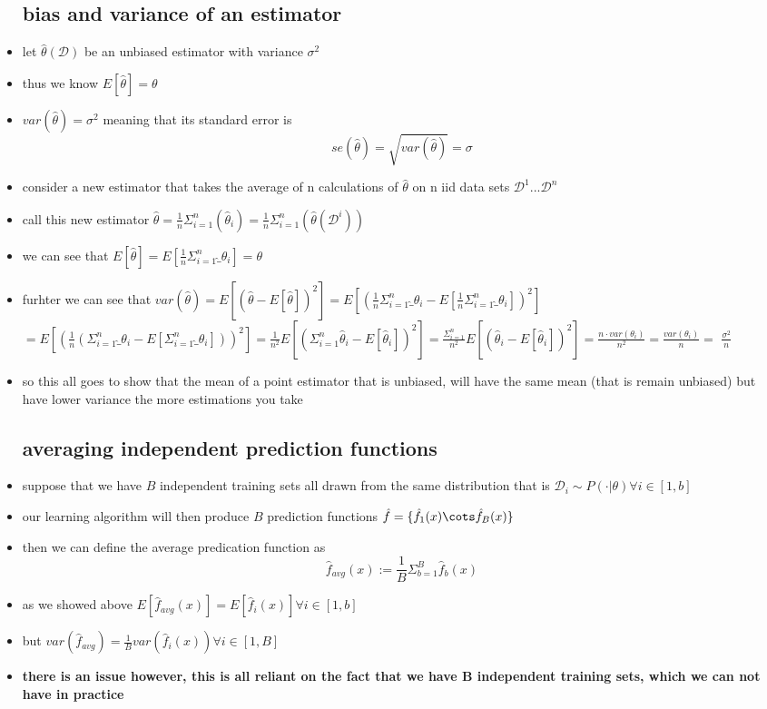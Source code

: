 \documentclass{article}
\begin{document}
\begin{itemize}
\subsection*{bias and variance of an estimator}
\item let $\hat{\theta}(\mathcal{D})$ be an unbiased estimator with variance $\sigma^2$ 
\item thus we know $E[\hat{\theta}]=\theta$
\item $var(\hat{\theta})=\sigma^2$ meaning that its standard error is $$se(\hat{\theta})=\sqrt{var(\hat{\theta})}=\sigma$$
\item consider  a new estimator that takes the average of n calculations of $\hat{\theta}$ on n iid data sets $\mathcal{D}^1...\mathcal{D}^n$
\item call this new estimator $\hat{\theta}=\frac{1}{n}\Sigma_{i=1}^{n}(\hat{\theta}_{i})=\frac{1}{n}\Sigma_{i=1}^{n}(\hat{\theta}(\mathcal{D}^i))$
\item we can see that $E[\hat{\theta}]=E[\frac{1}{n}\Sigma_{i=1}^{n}\hat_{\theta_i}]=\theta$
\item furhter we can see that $var(\hat{\theta})=E[(\hat{\theta}-E[\hat{\theta}])^2]=E[(\frac{1}{n}\Sigma_{i=1}^{n}\hat_{\theta_i}-E[\frac{1}{n}\Sigma_{i=1}^{n}\hat_{\theta_i}])^2]$ $=E[(\frac{1}{n}(\Sigma_{i=1}^{n}\hat_{\theta_i}-E[\Sigma_{i=1}^{n}\hat_{\theta_i}]))^2]=\frac{1}{n^2}E[(\Sigma_{i=1}^{n}  \hat{\theta}_i -E[\hat{\theta}_i] )^2 ]=\frac{\Sigma_{i=1}^{n}}{n^2}E[(
\hat{\theta}_i -E[\hat{\theta}_i] )^2 ]=\frac{n\cdot var(\theta_{i})}{n^2}=\frac{var(\theta_{i})}{n}=$ $\frac{\sigma^2}{n}$
\item so this all goes to show that the mean of a point estimator that is unbiased, will have the same mean (that is remain unbiased) but have lower variance the more estimations you take
\subsection*{averaging independent prediction functions }
\item suppose that we have $B$ independent training sets all drawn from the same distribution that is $\mathcal{D}_{i}\sim P(\cdot|\theta)\forall i\in [1,b]$
\item our learning algorithm will then produce $B$ prediction  functions $\hat{f}=\{\hat{f}_1(x)\cots \hat{f}_B(x)\}$
\item then we can define the average predication function as $$\hat{f}_{avg}(x):=\frac{1}{B}\Sigma_{b=1}^{B}\hat{f}_{b}(x)$$
\item as we showed above $E[\hat{f}_{avg}(x)]=E[\hat{f}_{i}(x)]\forall i \in [1,b]$
\item but $var(\hat{f}_{avg})=\frac{1}{B}var(\hat{f}_{i}(x))\forall i\in [1,B]$
\item \textbf{there is an issue however, this is all reliant on the fact that we have B independent training sets, which we can not have in practice}

\end{itemize}
\end{document}
